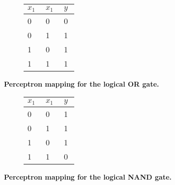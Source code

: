 \begin{figure}[!htp]
    \centering
    \begin{subfigure}[b]{0.70\textwidth}
        \centering
        
        \captionsetup{format=hang} %
        \label{fig:perceptron:or:mapping}
    \end{subfigure}\hfil
    \begin{subfigure}[b]{0.29\textwidth}
        \centering
        \renewcommand{\arraystretch}{1.5}
        \begin{tabular}{C{0.1\linewidth}C{0.1\linewidth}|C{0.1\linewidth}}
            \hline
            $x_1$ & $x_1$ & $y$ \\      & 0     & 0   \\
            0     & 1     & 1   \\
            1     & 0     & 1   \\
            1     & 1     & 1
        \end{tabular}
        \vspace{0.5cm}
        \label{fig:perceptron:or:truth}
    \end{subfigure}\hfil
    \captionsetup{format=hang} %
    \caption{
        \textbf{Perceptron mapping for the logical OR gate.}
    }
    \label{fig:perceptron:or}
\end{figure}

\begin{figure}[!htp]
    \centering
    \begin{subfigure}[b]{0.70\textwidth}
        \centering
        
        \captionsetup{format=hang} %
        \label{fig:perceptron:nand:mapping}
    \end{subfigure}\hfil
    \begin{subfigure}[b]{0.29\textwidth}
        \centering
        \renewcommand{\arraystretch}{1.5}
        \begin{tabular}{C{0.1\linewidth}C{0.1\linewidth}|C{0.1\linewidth}}
            \hline
            $x_1$ & $x_1$ & $y$ \\      & 0     & 1   \\
            0     & 1     & 1   \\
            1     & 0     & 1   \\
            1     & 1     & 0
        \end{tabular}
        \vspace{0.5cm}
        \label{fig:perceptron:nand:truth}
    \end{subfigure}\hfil
    \captionsetup{format=hang} %
    \caption{
        \textbf{Perceptron mapping for the logical NAND gate.}
    }
    \label{fig:perceptron:nand}
\end{figure}




